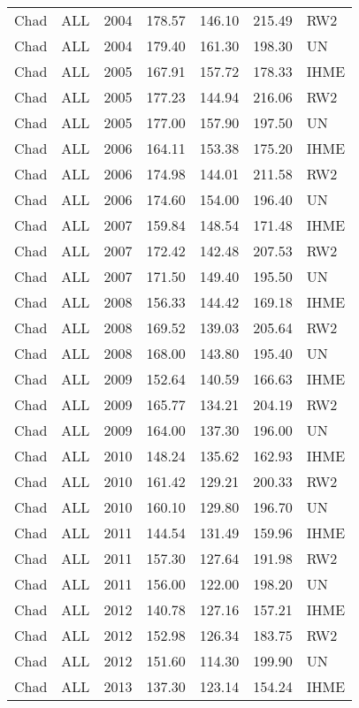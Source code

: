 \begin{longtable}{lllrrrl}
  Chad & ALL & 2004 & 178.57 & 146.10 & 215.49 & RW2 \\ 
  Chad & ALL & 2004 & 179.40 & 161.30 & 198.30 & UN \\ 
  Chad & ALL & 2005 & 167.91 & 157.72 & 178.33 & IHME \\ 
  Chad & ALL & 2005 & 177.23 & 144.94 & 216.06 & RW2 \\ 
  Chad & ALL & 2005 & 177.00 & 157.90 & 197.50 & UN \\ 
  Chad & ALL & 2006 & 164.11 & 153.38 & 175.20 & IHME \\ 
  Chad & ALL & 2006 & 174.98 & 144.01 & 211.58 & RW2 \\ 
  Chad & ALL & 2006 & 174.60 & 154.00 & 196.40 & UN \\ 
  Chad & ALL & 2007 & 159.84 & 148.54 & 171.48 & IHME \\ 
  Chad & ALL & 2007 & 172.42 & 142.48 & 207.53 & RW2 \\ 
  Chad & ALL & 2007 & 171.50 & 149.40 & 195.50 & UN \\ 
  Chad & ALL & 2008 & 156.33 & 144.42 & 169.18 & IHME \\ 
  Chad & ALL & 2008 & 169.52 & 139.03 & 205.64 & RW2 \\ 
  Chad & ALL & 2008 & 168.00 & 143.80 & 195.40 & UN \\ 
  Chad & ALL & 2009 & 152.64 & 140.59 & 166.63 & IHME \\ 
  Chad & ALL & 2009 & 165.77 & 134.21 & 204.19 & RW2 \\ 
  Chad & ALL & 2009 & 164.00 & 137.30 & 196.00 & UN \\ 
  Chad & ALL & 2010 & 148.24 & 135.62 & 162.93 & IHME \\ 
  Chad & ALL & 2010 & 161.42 & 129.21 & 200.33 & RW2 \\ 
  Chad & ALL & 2010 & 160.10 & 129.80 & 196.70 & UN \\ 
  Chad & ALL & 2011 & 144.54 & 131.49 & 159.96 & IHME \\ 
  Chad & ALL & 2011 & 157.30 & 127.64 & 191.98 & RW2 \\ 
  Chad & ALL & 2011 & 156.00 & 122.00 & 198.20 & UN \\ 
  Chad & ALL & 2012 & 140.78 & 127.16 & 157.21 & IHME \\ 
  Chad & ALL & 2012 & 152.98 & 126.34 & 183.75 & RW2 \\ 
  Chad & ALL & 2012 & 151.60 & 114.30 & 199.90 & UN \\ 
  Chad & ALL & 2013 & 137.30 & 123.14 & 154.24 & IHME \\ 

\end{longtable}
